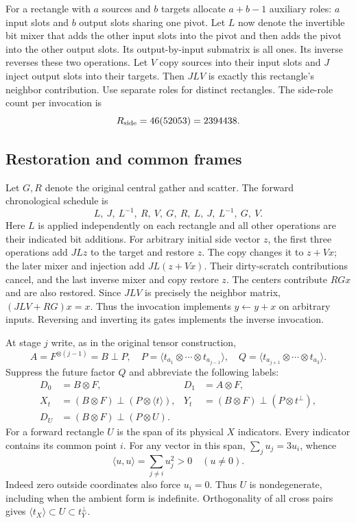 For a rectangle with $a$ sources and $b$ targets allocate $a+b-1$ auxiliary
roles: $a$ input slots and $b$ output slots sharing one pivot. Let $L$ now
denote the invertible bit mixer that adds the other input slots into the
pivot and then adds the pivot into the other output slots. Its output-by-input
submatrix is all ones. Its inverse reverses these two operations.
Let $V$ copy sources into their input slots and $J$ inject output slots into
their targets. Then $JLV$ is exactly this rectangle's neighbor contribution.
Use separate roles for distinct rectangles. The side-role count per invocation is
\[
 R_{\rm side}=46(52053)=2394438.
\]

\subsection{Restoration and common frames}
Let $G,R$ denote the original central gather and scatter. The forward
chronological schedule is
\[
 L,\ J,\ L^{-1},\ R,\ V,\ G,\ R,\ L,\ J,\ L^{-1},\ G,\ V.
\]
Here $L$ is applied independently on each rectangle and all other operations
are their indicated bit additions. For arbitrary initial side vector $z$,
the first three operations add $JLz$ to the target and restore $z$.
The copy changes it to $z+Vx$; the later mixer and injection add
$JL(z+Vx)$. Their dirty-scratch contributions cancel, and the last inverse
mixer and copy restore $z$. The centers contribute $RGx$ and are also restored.
Since $JLV$ is precisely the neighbor matrix,
$(JLV+RG)x=x$. Thus the invocation implements $y\gets y+x$ on arbitrary
inputs. Reversing and inverting its gates implements the inverse invocation.

At stage $j$ write, as in the original tensor construction,
\[
 A=F^{\otimes(j-1)}=B\mathbin\perp P,\quad
 P=\langle t_{a_1}\otimes\cdots\otimes t_{a_{j-1}}\rangle,
 \quad Q=\langle t_{a_{j+1}}\otimes\cdots\otimes t_{a_3}\rangle.
\]
Suppress the future factor $Q$ and abbreviate the following labels:
\begin{align*}
 D_0&=B\otimes F,& D_1&=A\otimes F,\\
 X_t&=(B\otimes F)\mathbin\perp(P\otimes\langle t\rangle),&
 Y_t&=(B\otimes F)\mathbin\perp(P\otimes t^\perp),\\
 D_U&=(B\otimes F)\mathbin\perp(P\otimes U).
\end{align*}
For a forward rectangle $U$ is the span of its physical $X$ indicators.
Every indicator contains its common point $i$. For any vector in this span,
$\sum_j u_j=3u_i$, whence
\[
 \langle u,u\rangle=\sum_{j\ne i}u_j^2>0\quad(u\ne0).
\]
Indeed zero outside coordinates also force $u_i=0$. Thus $U$ is
nondegenerate, including when the ambient form is indefinite. Orthogonality
of all cross pairs gives $\langle t_X\rangle\subset U\subset t_Y^\perp$.

